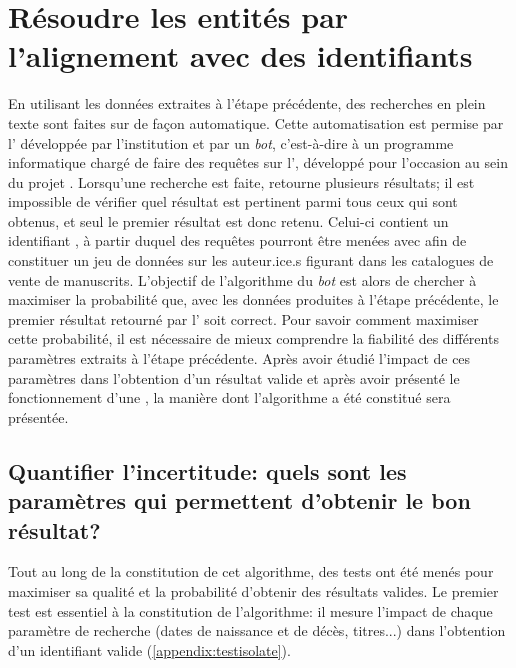 \chapter{Résoudre les entités par l'alignement avec des identifiants \wkd{}}
En utilisant les données extraites à l'étape précédente, des recherches en plein texte sont faites sur \wkd{} de façon automatique. Cette automatisation est permise par l'\api{} développée par l'institution et par un \textit{bot}, c'est-à-dire à un programme informatique chargé de faire des requêtes sur l'\api{}, développé pour l'occasion au sein du projet \mssktb{}. Lorsqu'une recherche est faite, \wkd{} retourne plusieurs résultats; il est impossible de vérifier quel résultat est pertinent parmi tous ceux qui sont obtenus, et seul le premier résultat est donc retenu. Celui-ci contient un identifiant \wkd{}, à partir duquel des requêtes pourront être menées avec \sparql{} afin de constituer un jeu de données sur les auteur.ice.s figurant dans les catalogues de vente de manuscrits. L'objectif de l'algorithme du \textit{bot} est alors de chercher à maximiser la probabilité que, avec les données produites à l'étape précédente, le premier résultat retourné par l'\api{} soit correct. Pour savoir comment maximiser cette probabilité, il est nécessaire de mieux comprendre la fiabilité des différents paramètres extraits à l'étape précédente. Après avoir étudié l'impact de ces paramètres dans l'obtention d'un résultat valide et après avoir présenté le fonctionnement d'une \api{}, la manière dont l'algorithme a été constitué sera présentée.


\section{Quantifier l'incertitude: quels sont les paramètres qui permettent d'obtenir le bon résultat?}
Tout au long de la constitution de cet algorithme, des tests ont été menés pour maximiser sa qualité et la probabilité d'obtenir des résultats valides. Le premier test est essentiel à la constitution de l'algorithme: il mesure l'impact de chaque paramètre de recherche (dates de naissance et de décès, titres...) dans l'obtention d'un identifiant valide (\ref{appendix:testisolate}).

